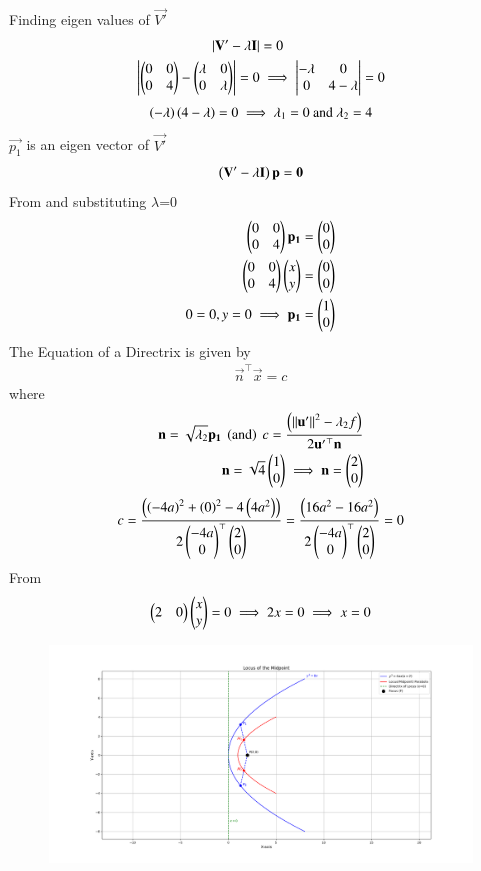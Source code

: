 \documentclass[journal]{IEEEtran}
\begin{document}
 Finding eigen values of $\vec{V'}$
 \begin{align}
         |\mathbf{V'}-\lambda\mathbf{I}|&=0\\
         \begin{vmatrix}\begin{pmatrix}0&0\\0&4\end{pmatrix}-\begin{pmatrix}\lambda&0\\0&\lambda\end{pmatrix}\end{vmatrix}=0&\implies \begin{vmatrix}-\lambda&0\\0& 4-\lambda\end{vmatrix}=0
     \end{align}
     \begin{align}
         \brak{-\lambda}\brak{4-\lambda}=0 \implies \lambda_1=0\ \text{and}\ \lambda_2=4
     \end{align}
$\vec{p_1}$ is an eigen vector of $\vec{V'}$
\begin{align}
   \left( \mathbf{\mathbf{V'}-\lambda\mathbf{I}}\right)\mathbf{p}=\mathbf{0}
\end{align}
From  and substituting $\lambda$=0
\begin{align}
    \begin{pmatrix}0&0\\0&4\end{pmatrix}\mathbf{p_1}=\begin{pmatrix}0\\0\end{pmatrix}\\
    \begin{pmatrix}0&0\\0&4\end{pmatrix}\begin{pmatrix}x\\y\end{pmatrix}=\begin{pmatrix}0\\0\end{pmatrix} \\
    0=0,y=0 \implies \mathbf{p_1}=\begin{pmatrix}1\\0\end{pmatrix}
\end{align}
 The Equation of a Directrix is given by
 \begin{align}
     \vec{n}^\top\vec{x}=c
 \end{align}
 where
 \begin{align}
     \vec{n}=\sqrt{\lambda_2}\vec{p_1}\ \brak{\text{and}}\ c=\frac{\brak{\norm{\vec{u'}}^2-\lambda_2f}}{2\vec{u'}^\top\vec{n}} \\
     \vec{n}=\sqrt{4}\myvec{1\\0} \implies \vec{n}=\myvec{2\\0} 
     \end{align}
     \begin{align}
     c=\frac{\left(\left(-4a\right)^2+\left(0\right)^2-4\left(4a^2\right)\right)}{2\begin{pmatrix}-4a\\0\end{pmatrix}^\top\begin{pmatrix}2\\0\end{pmatrix}}  =\frac{\left(16a^2-16a^2\right)}{2\begin{pmatrix}-4a\\0\end{pmatrix}^\top\begin{pmatrix}2\\0\end{pmatrix}}  =0
 \end{align}
 From 
 \begin{align}
     \begin{pmatrix}2&0\end{pmatrix}\begin{pmatrix}x\\y\end{pmatrix}=0 \implies 2x=0 \implies x=0
 \end{align}
 \begin{figure}[h!]
   \centering
   \includegraphics[width=0.98\columnwidth]{figs/fig1.png}
	\caption{}
   \label{}
\end{figure}
\end{document}
